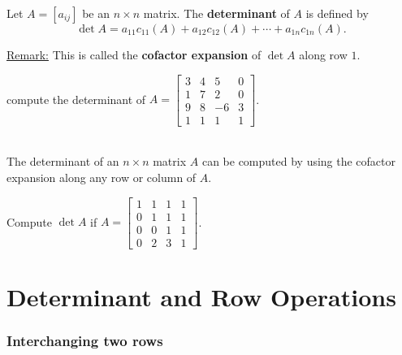 \documentclass[20pt,a4paper]{extarticle}
\newcounter{example}
\newcounter{theorem}
\newcounter{definition}
\begin{document}
\begin{definition}
Let $A = [a_{ij}]$ be an $n \times n$ matrix. The \textbf{determinant} of $A$ is defined by
	\[
		\det A = a_{11} c_{11} (A) + a_{12} c_{12} (A) + \cdots + a_{1n} c_{1n} (A) .
	\]
\end{definition}

\underline{Remark:} This is called the \textbf{cofactor expansion} of $\det A$ along row $1$.

\begin{example}
compute the determinant of $A = \begin{bmatrix} 3 & 4 & 5 & 0 \\ 1 & 7 & 2 & 0\\ 9 & 8 & -6 & 3 \\ 1 & 1 & 1 & 1 \end{bmatrix}$.
\end{example}

\begin{solution}

\end{solution}

\newpage 

\begin{theorem}\\
The determinant of an $n \times n$ matrix $A$ can be computed by using the cofactor expansion along any row or column of $A$.
\end{theorem}

\begin{example}
Compute $\det A$ if $A = \begin{bmatrix} 1 & 1 & 1 & 1 \\ 0 & 1 & 1 & 1 \\ 0 & 0 & 1 & 1 \\ 0 & 2 & 3 & 1 \end{bmatrix}$.
\end{example}

\begin{solution}

\end{solution}

\newpage 

\section{Determinant and Row Operations}

\subsubsection{Interchanging two rows}
\end{document}
